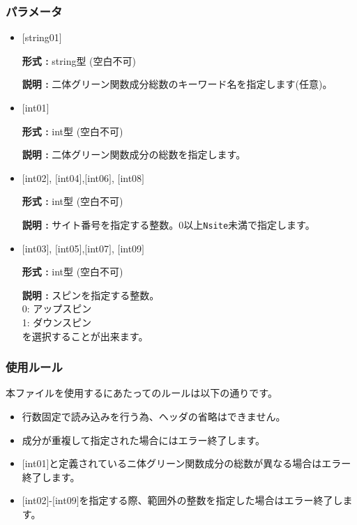 \subsubsection{パラメータ}
 \begin{itemize}

   \item  $[$string01$]$
   
    {\bf 形式 :} string型 (空白不可)

   {\bf 説明 :} 二体グリーン関数成分総数のキーワード名を指定します(任意)。

   \item  $[$int01$]$
   
    {\bf 形式 :} int型 (空白不可)

   {\bf 説明 :} 二体グリーン関数成分の総数を指定します。

  \item  $[$int02$]$, $[$int04$]$,$[$int06$]$, $[$int08$]$

 {\bf 形式 :} int型 (空白不可)

{\bf 説明 :} サイト番号を指定する整数。0以上\verb|Nsite|{未満}で指定します。
 
  \item  $[$int03$]$, $[$int05$]$,$[$int07$]$, $[$int09$]$

 {\bf 形式 :} int型 (空白不可)

{\bf 説明 :} スピンを指定する整数。\\
0: アップスピン\\
1: ダウンスピン\\
を選択することが出来ます。

\end{itemize}

\subsubsection{使用ルール}
本ファイルを使用するにあたってのルールは以下の通りです。
\begin{itemize}
\item 行数固定で読み込みを行う為、ヘッダの省略はできません。
\item 成分が重複して指定された場合にはエラー終了します。
\item $[$int01$]$と定義されているニ体グリーン関数成分の総数が異なる場合はエラー終了します。
\item $[$int02$]$-$[$int09$]$を指定する際、範囲外の整数を指定した場合はエラー終了します。
\end{itemize}

